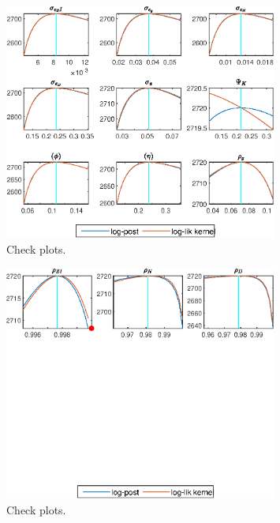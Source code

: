  
\begin{figure}[H]
\centering 
\includegraphics[width=0.80\textwidth]{BRS_growth_ext_shopping/graphs/BRS_growth_ext_shopping_CheckPlots1}
\caption{Check plots.}\label{Fig:CheckPlots:1}
\end{figure}
 
\begin{figure}[H]
\centering 
\includegraphics[width=0.80\textwidth]{BRS_growth_ext_shopping/graphs/BRS_growth_ext_shopping_CheckPlots2}
\caption{Check plots.}\label{Fig:CheckPlots:2}
\end{figure}
 
